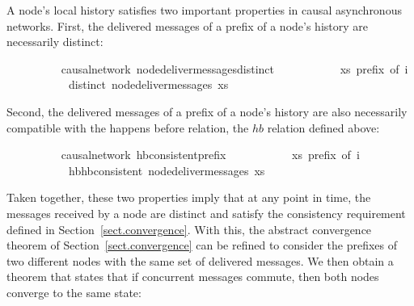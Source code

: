 \documentclass[acmlarge,review,anonymous]{acmart}\settopmatter{printfolios=true}
\begin{document}
A node's local history satisfies two important properties in causal asynchronous networks.
First, the delivered messages of a prefix of a node's history are necessarily distinct:
\\
\begin{isabellebody}
\ \ \ \ \ \ \ \  {\isacharparenleft}\ causal{\isacharunderscore}network{\isacharparenright}\ node{\isacharunderscore}deliver{\isacharunderscore}messages{\isacharunderscore}distinct{\isacharcolon}\isanewline
\ \ \ \ \ \ \ \ \ \ \ {\isachardoublequoteopen}xs\ prefix\ of\ i{\isachardoublequoteclose}\isanewline
\ \ \ \ \ \ \ \ \ \ \ {\isachardoublequoteopen}distinct\ {\isacharparenleft}node{\isacharunderscore}deliver{\isacharunderscore}messages\ xs{\isacharparenright}{\isachardoublequoteclose}
\end{isabellebody}
\vspace{\baselineskip}
Second, the delivered messages of a prefix of a node's history are also necessarily compatible with the happens before relation, the $hb$ relation defined above:
\\
\begin{isabellebody}
\ \ \ \ \ \ \ \  {\isacharparenleft}\ causal{\isacharunderscore}network{\isacharparenright}\ hb{\isacharunderscore}consistent{\isacharunderscore}prefix{\isacharcolon}\isanewline
\ \ \ \ \ \ \ \ \ \ \ {\isachardoublequoteopen}xs\ prefix\ of\ i{\isachardoublequoteclose}\isanewline
\ \ \ \ \ \ \ \ \ \ \ {\isachardoublequoteopen}hb{\isachardot}hb{\isacharunderscore}consistent\ {\isacharparenleft}node{\isacharunderscore}deliver{\isacharunderscore}messages\ xs{\isacharparenright}{\isachardoublequoteclose}
\end{isabellebody}
\vspace{\baselineskip}
Taken together, these two properties imply that at any point in time, the messages received by a node are distinct and satisfy the consistency requirement defined in Section~\ref{sect.convergence}.
With this, the abstract convergence theorem of Section~\ref{sect.convergence} can be refined to consider the prefixes of two different nodes with the same set of delivered messages.
We then obtain a theorem that states that if concurrent messages commute, then both nodes converge to the same state:
\\
\end{document}
